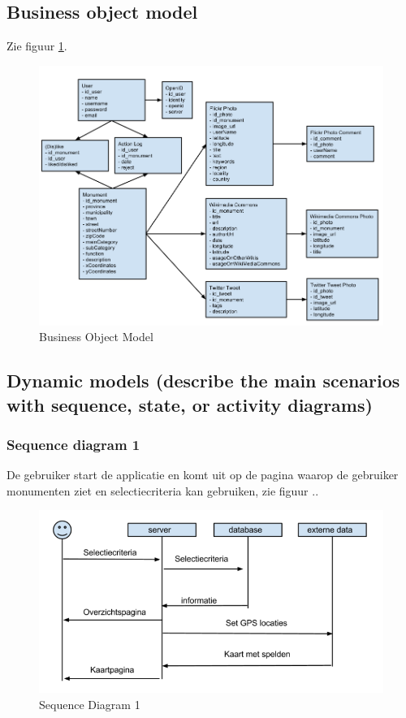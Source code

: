 \documentclass[a4paper,10pt]{article}
\begin{document}
		\subsection{Business object model}
		Zie figuur \ref{bom}.
		\begin{figure}[ht!]
			\centering
			\includegraphics[width=\textwidth]{BusinessObjectModel.png}
			\caption{Business Object Model \label{bom}}
		\end{figure}
		\subsection{Dynamic models (describe the main scenarios with sequence, state, or activity diagrams)}
			\subsubsection{Sequence diagram 1}
			De gebruiker start de applicatie en komt uit op de pagina waarop de gebruiker monumenten ziet en selectiecriteria kan gebruiken, zie figuur .. %
			\begin{figure}[ht!]
				\centering
				\includegraphics[width=\textwidth]{sequence1.png}
				\caption{Sequence Diagram 1 \label{sequence1}}
			\end{figure}
\end{document}
